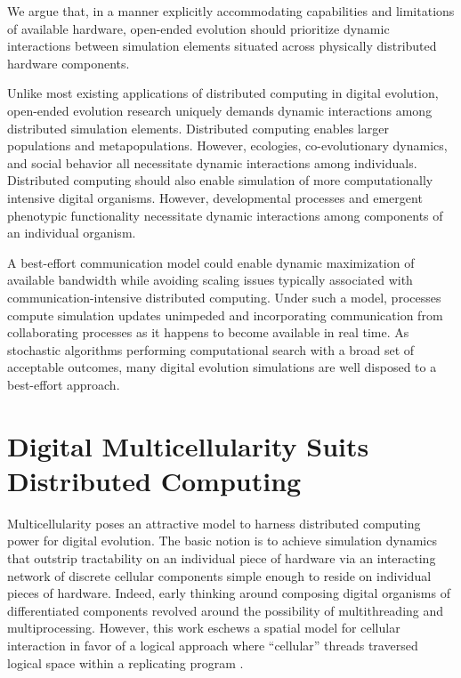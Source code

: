 We argue that, in a manner explicitly accommodating capabilities and limitations of available hardware, open-ended evolution should prioritize dynamic interactions between simulation elements situated across physically distributed hardware components.

Unlike most existing applications of distributed computing in digital evolution, open-ended evolution research uniquely demands dynamic interactions among distributed simulation elements.
Distributed computing enables larger populations and metapopulations.
However, ecologies, co-evolutionary dynamics, and social behavior all necessitate dynamic interactions among individuals.
Distributed computing should also enable simulation of more computationally intensive digital organisms.
However, developmental processes and emergent phenotypic functionality necessitate dynamic interactions among components of an individual organism.

A best-effort communication model could enable dynamic maximization of available bandwidth while avoiding scaling issues typically associated with communication-intensive distributed computing.
Under such a model, processes compute simulation updates unimpeded and incorporating communication from collaborating processes as it happens to become available in real time.
As stochastic algorithms performing computational search with a broad set of acceptable outcomes, many digital evolution simulations are well disposed to a best-effort approach.

\section{Digital Multicellularity Suits Distributed Computing}

Multicellularity poses an attractive model to harness distributed computing power for digital evolution.
The basic notion is to achieve simulation dynamics that outstrip tractability on an individual piece of hardware via an interacting network of discrete cellular components simple enough to reside on individual pieces of hardware.
Indeed, early thinking around composing digital organisms of differentiated components revolved around the possibility of multithreading and multiprocessing.
However, this work eschews a spatial model for cellular interaction in favor of a logical approach where ``cellular'' threads traversed logical space within a replicating program \citep{ofria1999evolution,ray2000evolution}.

